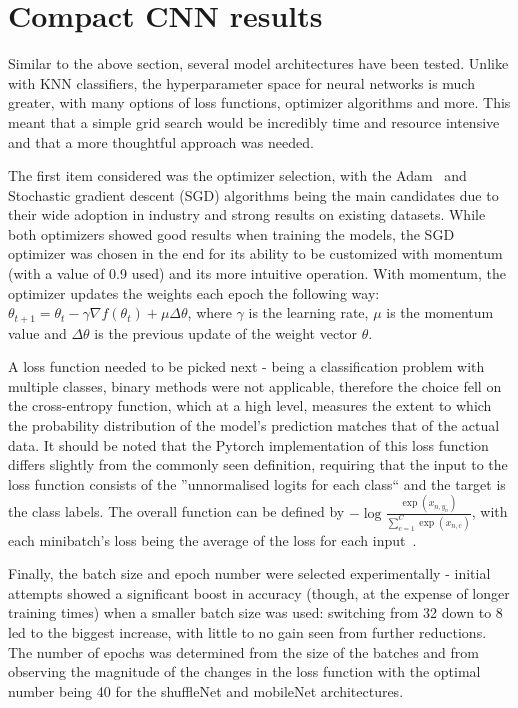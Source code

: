 \section{Compact CNN results}
\label{sec:compact-cnn-results}
Similar to the above section, several model architectures have been tested.
Unlike with KNN classifiers, the hyperparameter space for neural networks is much greater, with many options of loss functions,
optimizer algorithms and more.
This meant that a simple grid search would be incredibly time and resource intensive and that a more thoughtful approach was needed.

The first item considered was the optimizer selection, with the Adam~\cite{adamGrad} and Stochastic gradient descent (SGD) algorithms being
the main candidates due to their wide adoption in industry and strong results on existing datasets.
While both optimizers showed good results when training the models, the SGD optimizer was chosen in the end for its ability
to be customized with momentum (with a value of 0.9 used) and its more intuitive operation.
With momentum, the optimizer updates the weights each epoch the following way:
$\theta_{t+1}=\theta_{t} - \gamma\nabla{f(\theta_{t})}+\mu\Delta\theta$, where $\gamma$ is the learning rate,
$\mu$ is the momentum value and $\Delta\theta$ is the previous update of the weight vector $\theta$.

A loss function needed to be picked next - being a classification problem with multiple classes, binary methods were not applicable,
therefore the choice fell on the cross-entropy function, which at a high level, measures the extent to which the
probability distribution of the model's prediction matches that of the actual data.
It should be noted that the Pytorch implementation of this loss function differs slightly from the commonly seen definition,
requiring that the input to the loss function consists of the ''unnormalised logits for each class`` and the target is the class labels.
The overall function can be defined by $-\log{\frac{\exp(x_{n, y_{n}})}{\sum_{c=1}^C\exp(x_{n, c})}}$,
with each minibatch's loss being the average of the loss for each input~\cite{pytorchLibrary}.

Finally, the batch size and epoch number were selected experimentally - initial attempts showed a significant boost in accuracy
(though, at the expense of longer training times) when a smaller batch size was used: switching from 32 down to 8 led
to the biggest increase, with little to no gain seen from further reductions.
The number of epochs was determined from the size of the batches and from observing the magnitude of the changes in the loss function
with the optimal number being 40 for the shuffleNet and mobileNet architectures.

